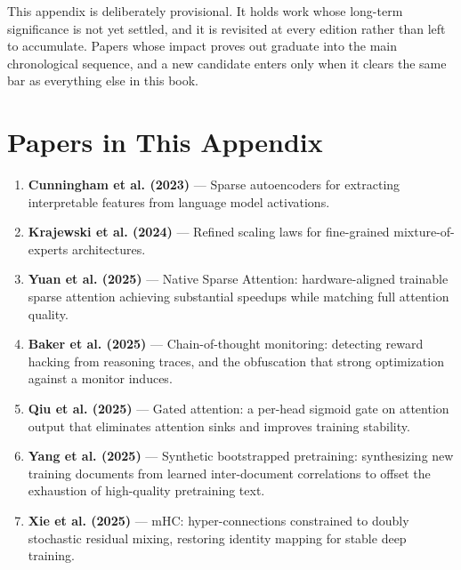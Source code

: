 
This appendix is deliberately provisional. It holds work whose long-term significance is not yet
settled, and it is revisited at every edition rather than left to accumulate. Papers whose impact
proves out graduate into the main chronological sequence, and a new candidate enters only when it
clears the same bar as everything else in this book.

\section*{Papers in This Appendix}

\begin{enumerate}
\item \textbf{Cunningham et al. (2023)} --- Sparse autoencoders for extracting interpretable features from language model activations.

\item \textbf{Krajewski et al. (2024)} --- Refined scaling laws for fine-grained mixture-of-experts architectures.

\item \textbf{Yuan et al. (2025)} --- Native Sparse Attention: hardware-aligned trainable sparse attention achieving substantial speedups while matching full attention quality.

\item \textbf{Baker et al. (2025)} --- Chain-of-thought monitoring: detecting reward hacking from reasoning traces, and the obfuscation that strong optimization against a monitor induces.

\item \textbf{Qiu et al. (2025)} --- Gated attention: a per-head sigmoid gate on attention output that eliminates attention sinks and improves training stability.

\item \textbf{Yang et al. (2025)} --- Synthetic bootstrapped pretraining: synthesizing new training documents from learned inter-document correlations to offset the exhaustion of high-quality pretraining text.

\item \textbf{Xie et al. (2025)} --- mHC: hyper-connections constrained to doubly stochastic residual mixing, restoring identity mapping for stable deep training.
\end{enumerate}
